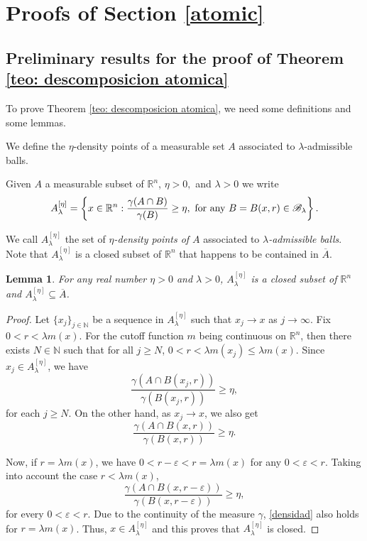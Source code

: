 \documentclass[leqno,11pt]{amsart}
\theoremstyle{plain}
\newtheorem{lemma}{Lemma}
\theoremstyle{remark}
\begin{document}
{{{ \section{Proofs of Section \ref{atomic}}

\subsection{Preliminary results for the proof of Theorem \ref{teo: descomposicion atomica}}

To prove Theorem \ref{teo: descomposicion atomica}, we need some definitions and some lemmas.



We define the $\eta$-density points of a measurable set $A$ associated to $\lambda$-admissible balls.

Given $A$ a measurable subset of ${\mathbb R}^n$, $\eta>0,$ and $\lambda >0$ we write
\begin{equation}\label{unonuevo}A^{[\eta]}_{\lambda}=\left\{x\in \mathbb R^n: \frac{\gamma(A\cap B)}{\gamma(B)}\geq \eta,  \hbox{ for any } B=B(x,r)\in \mathscr B_\lambda\right\}.\end{equation}

We call $A_\lambda^{[\eta]}$ the set of \textit{$\eta$-density points of  $A$} associated to \textit{$\lambda$-admissible balls}. Note that $A_\lambda^{[\eta]}$ is a closed subset of $\mathbb R^n$ that happens to be contained in $\overline{A}$.

\begin{lemma}\label{cerrado} For any real number $\eta>0$ and $\lambda>0$, $A^{[\eta]}_\lambda$ is a closed subset of $\mathbb R^n$ and $A^{[\eta]}_\lambda \subseteq \overline{A}$.
\end{lemma}
\begin{proof}
Let $\{x_j\}_{j\in{\mathbb N}}$ be a sequence in $A_\lambda^{[\eta]}$ such that $x_j\to x$ as $j\to \infty$. Fix $0<r<\lambda m(x)$. For the cutoff function $m$ being continuous on $\mathbb{R}^n$, then there exists $N\in \mathbb N$ such that for all $j\geq N$, $0<r<\lambda m(x_j)\leq \lambda m(x)$. Since $x_j\in A_\lambda^{[\eta]}$, we have
\[\frac{\gamma(A\cap B(x_j,r))}{\gamma(B(x_j,r))}\geq \eta,\]
for each $j\geq N$. On the other hand, as $x_j\to x$, we also get
\begin{equation}\label{densidad}
    \frac{\gamma(A\cap B(x,r))}{\gamma(B(x,r))}\geq \eta.
\end{equation}

Now, if $r=\lambda m(x)$, we have $0<r-\varepsilon<r=\lambda m(x)$ for any $0<\varepsilon<r$. Taking into account the case $r<\lambda m(x)$,
\[\frac{\gamma(A\cap B(x,r-\varepsilon))}{\gamma(B(x,r-\varepsilon))}\geq \eta,\]
for every $0<\varepsilon<r$. Due to the continuity of the measure $\gamma$, \eqref{densidad} also holds for $r=\lambda m(x)$.  Thus, $x\in A_\lambda^{[\eta]}$ and this proves that $A_\lambda^{[\eta]}$ is closed.


\end{proof}}}}
\end{document}
